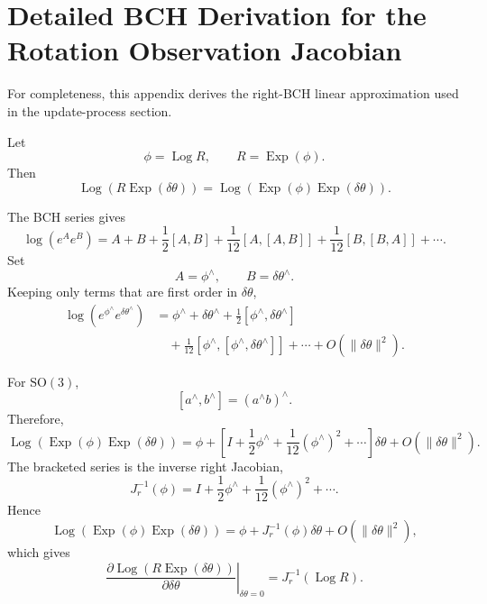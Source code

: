 \documentclass[11pt]{article}
\numberwithin{equation}{section}
\newcommand{\Exp}{\operatorname{Exp}}
\newcommand{\Log}{\operatorname{Log}}
\newcommand{\SO}{\mathrm{SO}}
\begin{document}
\appendix

\section{Detailed BCH Derivation for the Rotation Observation Jacobian}

For completeness, this appendix derives the right-BCH linear
approximation used in the update-process section.

Let
\[
\phi=\Log R,
\qquad
R=\Exp(\phi).
\]
Then
\[
\Log\!\left(R\Exp(\delta\theta)\right)
=
\Log\!\left(\Exp(\phi)\Exp(\delta\theta)\right).
\]

The BCH series gives
\[
\log(e^Ae^B)
=
A+B+\frac12[A,B]
+\frac1{12}[A,[A,B]]
+\frac1{12}[B,[B,A]]
+\cdots.
\]
Set
\[
A=\phi^\wedge,
\qquad
B=\delta\theta^\wedge.
\]
Keeping only terms that are first order in $\delta\theta$,
\[
\begin{aligned}
\log\!\left(
e^{\phi^\wedge}e^{\delta\theta^\wedge}
\right)
&=
\phi^\wedge+\delta\theta^\wedge
+\frac12[\phi^\wedge,\delta\theta^\wedge]\\
&\quad
+\frac1{12}
[\phi^\wedge,[\phi^\wedge,\delta\theta^\wedge]]
+\cdots
+O(\|\delta\theta\|^2).
\end{aligned}
\]

For $\SO(3)$,
\[
[a^\wedge,b^\wedge]=(a^\wedge b)^\wedge.
\]
Therefore,
\[
\Log\!\left(
\Exp(\phi)\Exp(\delta\theta)
\right)
=
\phi+
\left[
I+\frac12\phi^\wedge
+\frac1{12}(\phi^\wedge)^2+\cdots
\right]\delta\theta
+O(\|\delta\theta\|^2).
\]
The bracketed series is the inverse right Jacobian,
\[
J_r^{-1}(\phi)
=
I+\frac12\phi^\wedge
+\frac1{12}(\phi^\wedge)^2+\cdots.
\]
Hence
\[
\Log\!\left(
\Exp(\phi)\Exp(\delta\theta)
\right)
=
\phi+J_r^{-1}(\phi)\delta\theta
+O(\|\delta\theta\|^2),
\]
which gives
\[
\boxed{
\left.
\frac{\partial\Log(R\Exp(\delta\theta))}
{\partial\delta\theta}
\right|_{\delta\theta=0}
=
J_r^{-1}(\Log R).
}
\]
\end{document}
